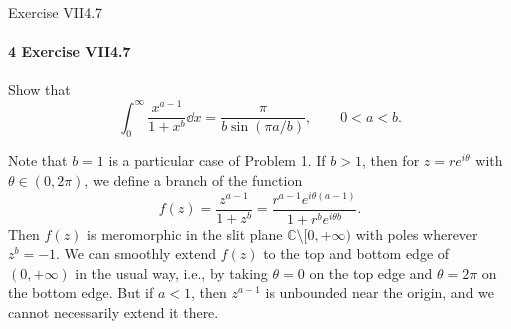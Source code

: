 \documentclass[12pt]{article}
\newenvironment{fullbox}{\begin{lrbox}{\savefullbox}\begin{minipage}{\dimexpr\textwidth-2\fboxsep\relax}}{\end{minipage}\end{lrbox}\begin{center}\framebox[\textwidth]{\usebox{\savefullbox}}\end{center}}
\newenvironment{pbox}[1][]{\begin{fullbox}\ifx#1\empty\else\paragraph{#1}\fi}{\end{fullbox}}
\theoremstyle{definition}
\newcommand{\C}{\mathbb{C}}
\begin{document}
\newpage
\begin{pbox}[4 Exercise VII4.7]
    Show that
    \[
        \int_{0}^{\infty} \frac{x^{a-1}}{1 + x^b} \dd{x} = \frac{\pi}{b \sin(\pi a/b)}, \qquad 0 < a < b.
    \]
\end{pbox}

Note that $b = 1$ is a particular case of Problem 1. If $b > 1$, then for $z = r e^{i\theta}$ with $\theta \in (0, 2\pi)$, we define a branch of the function
\[
    f(z)
        = \frac{z^{a-1}}{1 + z^b}
        = \frac{r^{a-1}e^{i\theta(a-1)}}{1 + r^b e^{i\theta b}}.
\]
Then $f(z)$ is meromorphic in the slit plane $\C \setminus [0, + \infty)$ with poles wherever $z^b = -1$. We can smoothly extend $f(z)$ to the top and bottom edge of $(0, +\infty)$ in the usual way, i.e., by taking $\theta = 0$ on the top edge and $\theta = 2\pi$ on the bottom edge. But if $a < 1$, then $z^{a-1}$ is unbounded near the origin, and we cannot necessarily extend it there.
\end{document}
